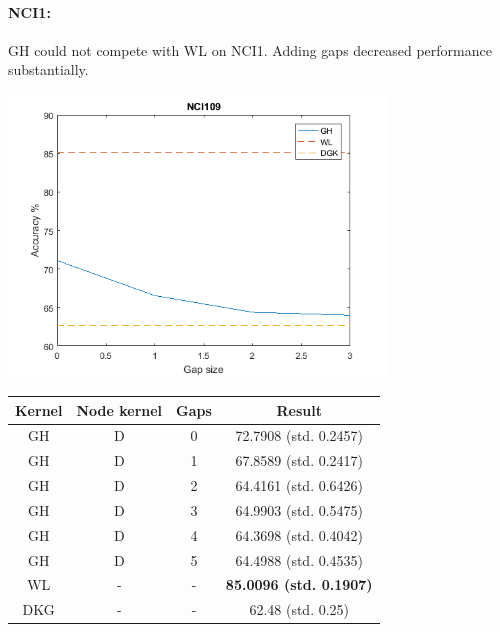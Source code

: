 \documentclass{article}
\begin{document}
\paragraph{NCI1:}
GH could not compete with WL on NCI1. Adding gaps decreased performance substantially.\\
\begin{minipage}{0.6\linewidth}
	\hspace*{-1in}
	\includegraphics[width=10cm]{nci1}
	\label{fig:nci1}
\end{minipage}
\begin{minipage}[c]{0.5\linewidth}
	
	\centering
	\begin{tabular}{c|c|c|c}
		Kernel & Node kernel & Gaps & Result\\
		\hline
		GH & D & 0 & 72.7908 (std. 0.2457)\\
		GH & D & 1 & 67.8589 (std. 0.2417)\\
		GH & D & 2 & 64.4161 (std. 0.6426)\\
		GH & D & 3 & 64.9903 (std. 0.5475)\\
		GH & D & 4 & 64.3698 (std. 0.4042)\\
		GH & D & 5 & 64.4988 (std. 0.4535)\\
		WL & - & - & \textbf{85.0096 (std. 0.1907)}\\
		DKG\cite{yanardag} & - & - & 62.48 (std. 0.25)
	\end{tabular}
	\label{table:nci1}
\end{minipage}
\end{document}
